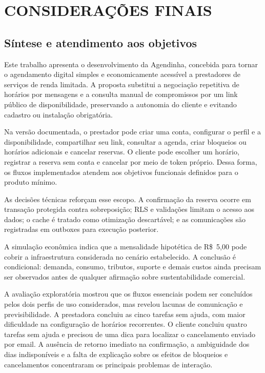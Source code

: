 \section{CONSIDERAÇÕES FINAIS}

\subsection{Síntese e atendimento aos objetivos}

Este trabalho apresenta o desenvolvimento da Agendinha, concebida para tornar o agendamento digital simples e economicamente acessível a prestadores de serviços de renda limitada. A proposta substitui a negociação repetitiva de horários por mensagens e a consulta manual de compromissos por um link público de disponibilidade, preservando a autonomia do cliente e evitando cadastro ou instalação obrigatória.

Na versão documentada, o prestador pode criar uma conta, configurar o perfil e a disponibilidade, compartilhar seu link, consultar a agenda, criar bloqueios ou horários adicionais e cancelar reservas. O cliente pode escolher um horário, registrar a reserva sem conta e cancelar por meio de token próprio. Dessa forma, os fluxos implementados atendem aos objetivos funcionais definidos para o produto mínimo.

As decisões técnicas reforçam esse escopo. A confirmação da reserva ocorre em transação protegida contra sobreposição; RLS e validações limitam o acesso aos dados; o cache é tratado como otimização descartável; e as comunicações são registradas em outboxes para execução posterior.

A simulação econômica indica que a mensalidade hipotética de R\$~5,00 pode cobrir a infraestrutura considerada no cenário estabelecido. A conclusão é condicional: demanda, consumo, tributos, suporte e demais custos ainda precisam ser observados antes de qualquer afirmação sobre sustentabilidade comercial.

A avaliação exploratória mostrou que os fluxos essenciais podem ser concluídos pelos dois perfis de uso considerados, mas revelou lacunas de comunicação e previsibilidade. A prestadora concluiu as cinco tarefas sem ajuda, com maior dificuldade na configuração de horários recorrentes. O cliente concluiu quatro tarefas sem ajuda e precisou de uma dica para localizar o cancelamento enviado por email. A ausência de retorno imediato na confirmação, a ambiguidade dos dias indisponíveis e a falta de explicação sobre os efeitos de bloqueios e cancelamentos concentraram os principais problemas de interação.

